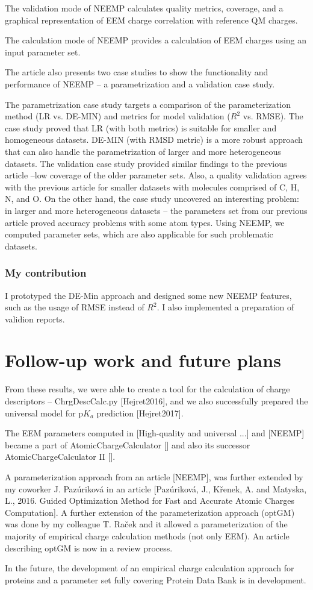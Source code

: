 The validation mode of NEEMP calculates quality metrics, coverage, and a
graphical representation of EEM charge correlation with reference QM charges.

The calculation mode of NEEMP provides a calculation of EEM charges using an
input parameter set.

The article also presents two case studies to show the functionality and
performance of NEEMP – a parametrization and a validation case study.

The parametrization case study targets a comparison of the parameterization
method (LR vs. DE-MIN) and metrics for model validation ($R^2$ vs. RMSE).
The case study proved that LR (with both metrics) is suitable for smaller
and homogeneous datasets. DE-MIN (with RMSD metric) is a more robust approach
that can also handle the parametrization of larger and more heterogeneous
datasets. The validation case study provided similar findings to the previous
article –low coverage of the older parameter sets. Also, a quality validation
agrees with the previous article for smaller datasets with molecules comprised
of C, H, N, and O. On the other hand, the case study uncovered an interesting
problem: in larger and more heterogeneous datasets -- the parameters set from
our previous article proved accuracy problems with some atom types. Using NEEMP,
we computed parameter sets, which are also applicable for such problematic
datasets.

\subsection{My contribution}

I prototyped the DE-Min approach and designed some new NEEMP features, such as
the usage of RMSE instead of $R^2$. I also implemented a preparation of validion
reports.

\chapter{Follow-up work and future plans}

From these results, we were able to create a tool for the calculation
of charge descriptors -- ChrgDescCalc.py [Hejret2016], and we also
successfully prepared the universal model for p$K_a$ prediction [Hejret2017].

The EEM parameters computed in [High-quality and universal ...] and [NEEMP]
became a part of AtomicChargeCalculator [] and also its successor 
AtomicChargeCalculator II [].

A parameterization approach from an article [NEEMP], was further extended
by my coworker J. Pazúriková in an article [Pazúriková, J., Křenek, A. and
Matyska, L., 2016. Guided Optimization Method for Fast and Accurate Atomic
Charges Computation]. A further extension of the parameterization approach
(optGM) was done by my colleague T. Raček and it allowed a parameterization
of the majority of empirical charge calculation methods (not only EEM).
An article describing optGM is now in a review process.

In the future, the development of an empirical charge calculation approach
for proteins and a parameter set fully covering Protein Data Bank is
in development.

